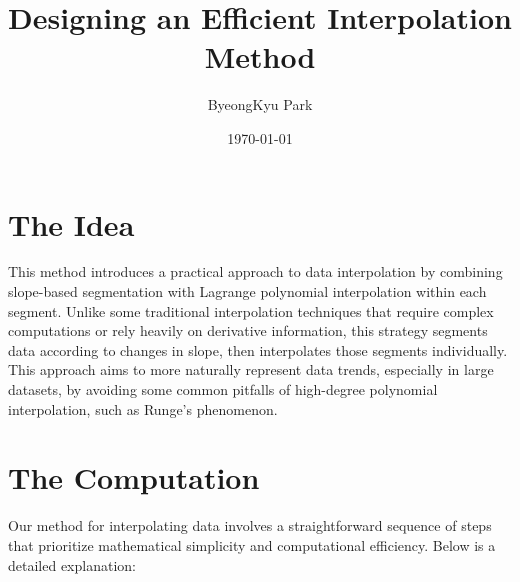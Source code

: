 \documentclass{article}
\title{Designing an Efficient Interpolation Method}
\author{ByeongKyu Park}
\date{\today}
\begin{document}
\maketitle
\section{The Idea}
This method introduces a practical approach to data interpolation by combining slope-based segmentation with Lagrange polynomial interpolation within each segment. Unlike some traditional interpolation techniques that require complex computations or rely heavily on derivative information, this strategy segments data according to changes in slope, then interpolates those segments individually. This approach aims to more naturally represent data trends, especially in large datasets, by avoiding some common pitfalls of high-degree polynomial interpolation, such as Runge's phenomenon.

\section{The Computation}
Our method for interpolating data involves a straightforward sequence of steps that prioritize mathematical simplicity and computational efficiency. Below is a detailed explanation:
\end{document}
